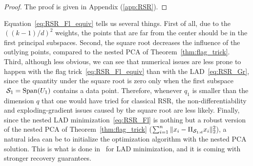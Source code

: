 \begin{proof}
The proof is given in Appendix (\autoref{app:RSR}).
\end{proof}
Equation~\eqref{eq:RSR_Fl_equiv} tells us several things. First of all, due to the $((k-1)/d)^2$ weights, the points that are far from the center should be in the first principal subspaces. Second, the square root decreases the influence of the outlying points, compared to the nested PCA of Theorem~\ref{thm:flag_trick}.
Third, although less obvious, we can see that numerical issues are less prone to happen with the flag trick~\eqref{eq:RSR_Fl_equiv} than with the LAD~\eqref{eq:RSR_Gr}, since the quantity under the square root is zero only when the first subspace $~{\S_1 = \operatorname{Span}(U_1)}$ contains a data point. Therefore, whenever $q_1$ is smaller than the dimension $q$ that one would have tried for classical RSR, the non-differentiability and exploding-gradient issues caused by the square root are less likely.
Finally, since the nested LAD minimization~\eqref{eq:RSR_Fl} is nothing but a robust version of the nested PCA of Theorem~\ref{thm:flag_trick} ($\sum_{i=1}^n \|x_i - \Pi_{\Sf} x_i\|_2^2$), a natural idea can be to initialize the optimization algorithm with the nested PCA solution. This is what is done in~\citet{maunu_well-tempered_2019} for LAD minimization, and it is coming with stronger recovery guarantees.

